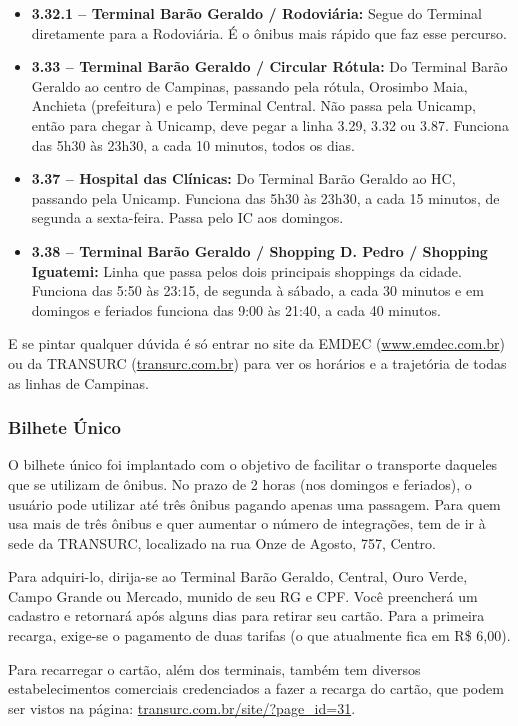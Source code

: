 \begin{itemize}
    \item  \textbf{3.32.1 -- Terminal Barão Geraldo / Rodoviária:} Segue do
        Terminal diretamente para a Rodoviária. É o ônibus mais rápido que faz
        esse percurso.

    \item  \textbf{3.33 -- Terminal Barão Geraldo / Circular Rótula:} Do
        Terminal Barão Geraldo ao centro de Campinas, passando pela rótula,
        Orosimbo Maia, Anchieta (prefeitura) e pelo Terminal Central. Não passa
        pela Unicamp, então para chegar à Unicamp, deve pegar a linha 3.29, 3.32
        ou 3.87. Funciona das 5h30 às 23h30, a cada 10 minutos, todos os dias.

    \item  \textbf{3.37 -- Hospital das Clínicas:} Do Terminal Barão Geraldo ao
        HC, passando pela Unicamp. Funciona das 5h30 às 23h30, a cada 15
        minutos, de segunda a sexta-feira. Passa pelo IC aos domingos.

    \item  \textbf{3.38 -- Terminal Barão Geraldo / Shopping D. Pedro / Shopping
        Iguatemi:} Linha que passa pelos dois principais shoppings da cidade.
        Funciona das 5:50 às 23:15, de segunda à sábado, a cada 30 minutos e em
        domingos e feriados funciona das 9:00 às 21:40, a cada 40 minutos.
\end{itemize}

E se pintar qualquer dúvida é só entrar no site da EMDEC
(\url{www.emdec.com.br}) ou da TRANSURC (\url{transurc.com.br}) para ver os
horários e a trajetória de todas as linhas de Campinas.

\subsubsection*{Bilhete Único}

O bilhete único foi implantado com o objetivo de facilitar o transporte daqueles
que se utilizam de ônibus. No prazo de 2 horas (nos domingos e feriados), o usuário 
pode utilizar até três ônibus pagando apenas uma passagem. Para quem usa mais de 
três ônibus e quer aumentar o número de integrações, tem de ir à sede da TRANSURC, 
localizado na rua Onze de Agosto, 757, Centro.

Para adquiri-lo, dirija-se ao Terminal Barão Geraldo, Central, Ouro Verde, Campo
Grande ou Mercado, munido de seu RG e CPF. Você preencherá um cadastro e
retornará após alguns dias para retirar seu cartão. Para a primeira recarga,
exige-se o pagamento de duas tarifas (o que atualmente fica em R\$ 6,00).

Para recarregar o cartão, além dos terminais, também tem diversos
estabelecimentos comerciais credenciados a fazer a recarga do cartão, que podem
ser vistos na página: \url{transurc.com.br/site/?page_id=31}.

